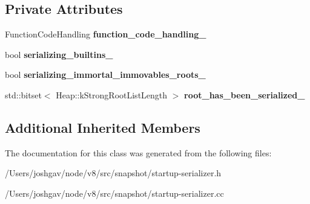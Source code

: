 \subsection*{Private Attributes}
\begin{DoxyCompactItemize}
\item 
Function\+Code\+Handling {\bfseries function\+\_\+code\+\_\+handling\+\_\+}\hypertarget{classv8_1_1internal_1_1_startup_serializer_a5efdb0a4ba6c54e12207070b80c12e19}{}\label{classv8_1_1internal_1_1_startup_serializer_a5efdb0a4ba6c54e12207070b80c12e19}

\item 
bool {\bfseries serializing\+\_\+builtins\+\_\+}\hypertarget{classv8_1_1internal_1_1_startup_serializer_a4d7ffbf694875f2d0ea6604e838dc1a2}{}\label{classv8_1_1internal_1_1_startup_serializer_a4d7ffbf694875f2d0ea6604e838dc1a2}

\item 
bool {\bfseries serializing\+\_\+immortal\+\_\+immovables\+\_\+roots\+\_\+}\hypertarget{classv8_1_1internal_1_1_startup_serializer_adf0491351fffb210b0b11ee66e976ee2}{}\label{classv8_1_1internal_1_1_startup_serializer_adf0491351fffb210b0b11ee66e976ee2}

\item 
std\+::bitset$<$ Heap\+::k\+Strong\+Root\+List\+Length $>$ {\bfseries root\+\_\+has\+\_\+been\+\_\+serialized\+\_\+}\hypertarget{classv8_1_1internal_1_1_startup_serializer_afe776f667514f0b72f9f4b5bb7e2b374}{}\label{classv8_1_1internal_1_1_startup_serializer_afe776f667514f0b72f9f4b5bb7e2b374}

\end{DoxyCompactItemize}
\subsection*{Additional Inherited Members}


The documentation for this class was generated from the following files\+:\begin{DoxyCompactItemize}
\item 
/\+Users/joshgav/node/v8/src/snapshot/startup-\/serializer.\+h\item 
/\+Users/joshgav/node/v8/src/snapshot/startup-\/serializer.\+cc\end{DoxyCompactItemize}
